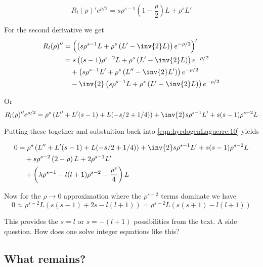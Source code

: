 \begin{equation}\label{eqn:hyrdogenLaguerre:30}
R_l(\rho)'  e^{\rho/2}
= s \rho^{s-1} \left(1 - \frac{\rho}{2}\right)L + \rho^s L'
\end{equation}

For the second derivative we get
\begin{align*}
R_l(\rho)''
&= \left( \left( s \rho^{s-1} L + \rho^s \left(L' - \inv{2} L\right) \right) e^{-\rho/2}  \right)' \\
&=
s
\left( (s-1) \rho^{s-2} L + \rho^s \left(L' - \inv{2} L\right) \right) e^{-\rho/2} \\
&\quad+\left( s \rho^{s-1} L' + \rho^s \left(L'' - \inv{2} L'\right) \right) e^{-\rho/2} \\
&\quad-\inv{2}\left( s \rho^{s-1} L + \rho^s \left(L' - \inv{2} L\right) \right) e^{-\rho/2} \\
\end{align*}

Or
\begin{equation}\label{eqn:hyrdogenLaguerre:40}
R_l(\rho)'' e^{\rho/2}
=
\rho^s \left( L'' + L' (s - 1 ) + L (-s/2 + 1/4) \right)
+ \inv{2} s \rho^{s-1} L'
+ s(s-1) \rho^{s-2} L
\end{equation}

Putting these together and substuition back into \ref{eqn:hyrdogenLaguerre:10} yields

\begin{align*}
0 &= \rho^s \left( L'' + L' (s - 1 ) + L (-s/2 + 1/4) \right)
+ \inv{2} s \rho^{s-1} L'
+ s(s-1) \rho^{s-2} L \\
&\quad+ s \rho^{s-2} \left(2 - \rho\right)L + 2 \rho^{s-1} L'  \\
&\quad+\left( \lambda\rho^{s-1} - l(l+1) \rho^{s-2} - \frac{\rho^s}{4} \right) L
\end{align*}

Now for the $\rho \rightarrow 0$ approximation where the $\rho^{s-2}$ terms dominate we have
\begin{equation}\label{eqn:hyrdogenLaguerre:50}
0 \approx
\rho^{s-2} L \left(
s(s-1) + 2 s - l(l+1)
\right)
=
\rho^{s-2} L \left(
s(s+1) - l(l+1)
\right)
\end{equation}

This provides the $s=l$ or $s = -(l+1)$ possibilities from the text.  A side question.  How does one solve integer equations like this?

\subsection{What remains?}

